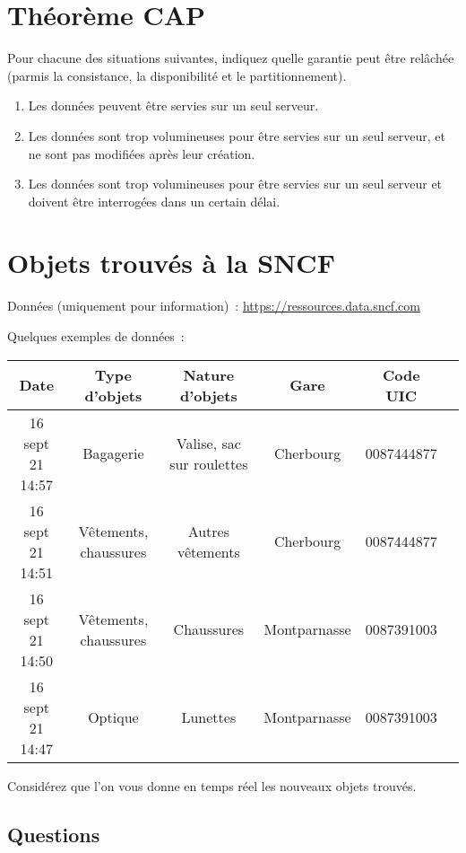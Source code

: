 \documentclass[12pt,letterpaper]{article}
\begin{document}
\section*{Théorème CAP}

Pour chacune des situations suivantes, indiquez quelle garantie peut être relâchée (parmis la consistance, la disponibilité et le partitionnement).

\begin{enumerate}
\item Les données peuvent être servies sur un seul serveur.
\item Les données sont trop volumineuses pour être servies sur un seul serveur, et ne sont pas modifiées après leur création.
\item Les données sont trop volumineuses pour être servies sur un seul serveur et doivent être interrogées dans un certain délai.
\end{enumerate}

\section*{Objets trouvés à la SNCF}

Données (uniquement pour information)~: \url{https://ressources.data.sncf.com}

Quelques exemples de données~:

\begin{tabular}{ | c | c | c | c | c | c |}
\hline
Date & Type d'objets & Nature d'objets & Gare & Code UIC \\ \hline
16 sept 21 14:57 & Bagagerie & Valise, sac sur roulettes & Cherbourg & 0087444877 \\ \hline
16 sept 21 14:51 & Vêtements, chaussures & Autres vêtements & Cherbourg & 0087444877 \\ \hline
16 sept 21 14:50 & Vêtements, chaussures & Chaussures & Montparnasse & 0087391003 \\ \hline
16 sept 21 14:47 & Optique & Lunettes & Montparnasse & 0087391003 \\ \hline
\end{tabular}

Considérez que l'on vous donne en temps réel les nouveaux objets trouvés.

\subsection*{Questions}
\end{document}
